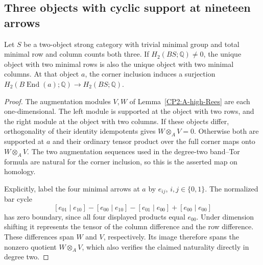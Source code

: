 \subsection{Three objects with cyclic support at nineteen arrows}

\begin{lemma}
\label{CP2:A-strong-pair-three-three-detector}
Let $S$ be a two-object strong category with trivial minimal group
and total minimal row and column counts both three. If
$H_2(BS;\mathbb Q)\ne0$, the unique object with two minimal rows
is also the unique object with two minimal columns. At that object
$a$, the corner inclusion induces a surjection
$H_2(B\operatorname{End}(a);\mathbb Q)\to H_2(BS;\mathbb Q)$.
\end{lemma}
\begin{proof}
The augmentation modules $V,W$ of
Lemma~\ref{CP2:A-high-Rees} are each one-dimensional. The left
module is supported at the object with two rows, and the right
module at the object with two columns. If these objects differ,
orthogonality of their identity idempotents gives
$W\otimes_A V=0$. Otherwise both are supported at $a$ and
their ordinary tensor product over the full corner maps onto
$W\otimes_A V$. The two augmentation sequences used in the
degree-two band--Tor formula are natural for the corner inclusion,
so this is the asserted map on homology.

Explicitly, label the four minimal arrows at $a$ by $e_{ij}$,
$i,j\in\{0,1\}$. The normalized bar cycle
\[
 [e_{01}\mid e_{10}]-[e_{00}\mid e_{10}]
 -[e_{01}\mid e_{00}]+[e_{00}\mid e_{00}]
\]
has zero boundary, since all four displayed products equal
$e_{00}$. Under dimension shifting it represents the tensor of
the column difference and the row difference. These differences
span $W$ and $V$, respectively. Its image therefore spans the
nonzero quotient $W\otimes_A V$, which also verifies the claimed
naturality directly in degree two.
\end{proof}

